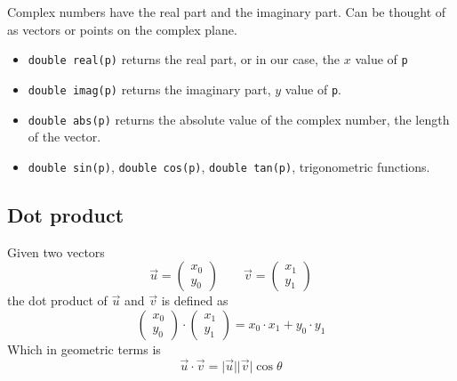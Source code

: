 \documentclass[12pt,t]{beamer}
\newcommand{\bi}{\begin{itemize}}
\newcommand{\ei}{\end{itemize}}
\begin{document}
\begin{frame}[fragile]
  \vspace{20pt}
  Complex numbers have the real part and the imaginary part. Can be thought of
  as vectors or points on the complex plane.
  \bi
    \item \texttt{double real(p)} returns the real part, or in our case, the $x$ value
      of \texttt{p}
    \item \texttt{double imag(p)} returns the imaginary part, $y$ value of \texttt{p}.
    \item \texttt{double abs(p)} returns the absolute value of the complex number, the
      length of the vector.
    \item \texttt{double sin(p)}, \texttt{double cos(p)}, \texttt{double tan(p)}, trigonometric
      functions.
  \ei
\end{frame}

\subsection{Dot product}
\begin{frame}
  \vspace{20pt}
  Given two vectors 
  \[
    \vec{u} = \begin{pmatrix} x_0 \\ y_0 \end{pmatrix} \quad\quad
    \vec{v} = \begin{pmatrix} x_1 \\ y_1 \end{pmatrix}
  \]
  the dot product of $\vec{u}$ and $\vec{v}$ is defined as 
  \[
    \begin{pmatrix} x_0 \\ y_0 \end{pmatrix} \cdot
    \begin{pmatrix} x_1 \\ y_1 \end{pmatrix} = 
    x_0 \cdot x_1 + y_0 \cdot y_1
  \]
  Which in geometric terms is
  \[
    \vec{u} \cdot \vec{v} = 
    \lvert \vec{u} \rvert \lvert \vec{v} \rvert \cos \theta
  \]
\end{frame}

\end{document}
